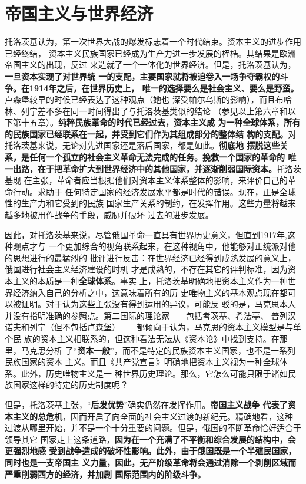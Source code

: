 \section{帝国主义与世界经济}

托洛茨基认为，第一次世界大战的爆发标志着一个时代结束。资本主义的进步作用已经终结，
资本主义民族国家已经成为生产力进一步发展的桎梏。其结果是欧洲帝国主义的出现，反过
来造就了一个一体化的世界经济。但是，托洛茨基认为，\textbf{一旦资本实现了对世界统
  一的支配，主要国家就将被迫卷入一场争夺霸权的斗争。在1914年之后，在世界历史上，
  唯一的选择要么是社会主义、要么是野蛮。}卢森堡较早的时候已经表达了这种观点（她也
深受帕尔乌斯的影响），而且布哈林、列宁差不多在同一时间得出了与托洛茨基类似的结论
（参见以上第六章和以下第十五章）。\textbf{纯粹民族革命的时代已经过去，资本主义成
  为一种全球体系，所有的民族国家已经联系在一起，并受到它们作为其组成部分的整体结
  构的支配。}对托洛茨基来说，无论对先进国家还是落后国家，都是如此。\textbf{彻底地
  摆脱这些关系，是任何一个孤立的社会主义革命无法完成的任务。挽救一个国家的革命的
  唯一出路，在于把革命扩大到世界经济中的其他国家，并逐渐削弱国际资本。}托洛茨基现
在主张，革命者应当根据他们对资本主义体系整体的影响，来评价自己的革命行动。求助于
任何特定国家的经济发展水平都是时代的错误。现在，正是全球性的生产力和它受到的民族
国家生产关系的制约，在发挥作用。这些力量将越来越多地被用作战争的手段，威胁并破坏
过去的进步发展。

因此，对托洛茨基来说，尽管俄国革命一直具有世界历史意义，但直到1917年,这种观点才与
一个更加综合的视角联系起来，在这种视角中，他能够对正统派对他的思想进行的最猛烈的
批评进行反击：在世界经济已经得到成熟发展的意义上，俄国进行社会主义经济建设的时机
才是成熟的，不存在其它的评判标准，因为资本主义的本质是一种\textbf{全球体系}。事实
上，托洛茨基明确地把资本主义作为一种世界经济纳入自己的分析之中，这意味着所有的历
史唯物主义的基本观点现在都可以被证明。对于认为这些主张没有得到运用的异议，可能反
驳的是，马克思本人并没有指明准确的参照点。第二国际的理论家——包括考茨基、希法亭、
普列汉诺夫和列宁（但不包括卢森堡）——都倾向于认为，马克思的资本主义模型是与单个民
族的资本主义相联系的，但这种看法无法从《资本论》中找到支持。在那里，马克思分析
了“\textbf{资本一般}”，而不是特定的民族资本主义国家，也不是一系列民族国家的资本
主义。而且《共产党宣言》明确地把资本主义视为一种全球体系。此外，历史唯物主义是一
种世界历史理论。那么，它怎么可能只限于诸如民族国家这样的特定的历史制度呢？

但是，托洛茨基主张，“\textbf{后发优势}”确实仍然在发挥作用。\textbf{帝国主义战争
  代表了资本主义的总危机}，因而开启了向全面的社会主义过渡的新纪元。精确地看，这种
过渡从哪里开始，并不是一个十分重要的问题。但是，俄国的不断革命恰好适合于领导其它
国家走上这条道路，\textbf{因为在一个充满了不平衡和综合发展的结构中，会更强烈地感
  受到战争造成的破坏性影响。此外，由于俄国既是一个半殖民国家，同时也是一支帝国主
  义力量，因此，无产阶级革命将会通过消除一个剥削区域而严重削弱西方的经济，并加剧
  国际范围内的阶级斗争。}

